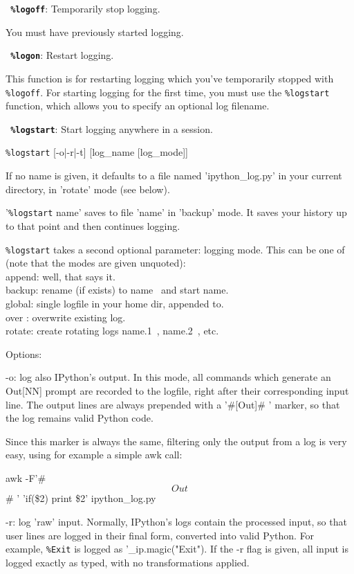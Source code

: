 \bigskip
\texttt{\textbf{ \%logoff}}:
	Temporarily stop logging.

        You must have previously started logging.

\bigskip
\texttt{\textbf{ \%logon}}:
	Restart logging.

        This function is for restarting logging which you've temporarily
        stopped with \texttt{\%logoff}. For starting logging for the first time, you
        must use the \texttt{\%logstart} function, which allows you to specify an
        optional log filename.

\bigskip
\texttt{\textbf{ \%logstart}}:
	Start logging anywhere in a session.

        \texttt{\%logstart} [-o|-r|-t] [log\_name [log\_mode]]

        If no name is given, it defaults to a file named 'ipython\_log.py' in your
        current directory, in 'rotate' mode (see below).

        '\texttt{\%logstart} name' saves to file 'name' in 'backup' mode.  It saves your
        history up to that point and then continues logging.

        \texttt{\%logstart} takes a second optional parameter: logging mode. This can be one
        of (note that the modes are given unquoted):\\
          append: well, that says it.\\
          backup: rename (if exists) to name~ and start name.\\
          global: single logfile in your home dir, appended to.\\
          over  : overwrite existing log.\\
          rotate: create rotating logs name.1~, name.2~, etc.

        Options:

          -o: log also IPython's output.  In this mode, all commands which
          generate an Out[NN] prompt are recorded to the logfile, right after
          their corresponding input line.  The output lines are always
          prepended with a '\#[Out]\# ' marker, so that the log remains valid
          Python code.

          Since this marker is always the same, filtering only the output from
          a log is very easy, using for example a simple awk call:

            awk -F'\#\[Out\]\# ' '{if(\$2) {print \$2}}' ipython\_log.py

          -r: log 'raw' input.  Normally, IPython's logs contain the processed
          input, so that user lines are logged in their final form, converted
          into valid Python.  For example, \texttt{\%Exit} is logged as
          '\_ip.magic("Exit").  If the -r flag is given, all input is logged
          exactly as typed, with no transformations applied.

